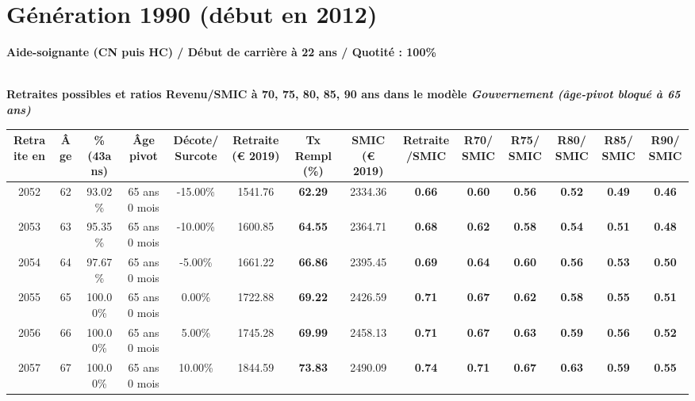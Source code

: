 \newpage 
 
\section{Génération 1990 (début en 2012)\label{AideSoignant_100_22_1990_0}} 
 
{\bf \noindent Aide-soignante (CN puis HC) / Début de carrière à 22 ans / Quotité : 100\%}  ~ 

 ~\\{\bf \noindent Retraites possibles et ratios Revenu/SMIC à 70, 75, 80, 85, 90 ans dans le modèle \emph{Gouvernement (âge-pivot bloqué à 65 ans)}}  
 
\begin{adjustbox}{max width=\textwidth} 
\begin{tabular}[htb]{|c|c||c|c|c||c|c||c|c||c|c|c|c|c|} 
\hline 
 Retraite en &  Âge &  \%(43ans) &  Âge pivot &  Décote/Surcote &  Retraite (\euro{} 2019) &  Tx Rempl(\%) &  SMIC (\euro{} 2019) &  Retraite/SMIC &  R70/SMIC &  R75/SMIC &  R80/SMIC &  R85/SMIC &  R90/SMIC \\ 
\hline \hline 
 2052 &  62 &  93.02\% &  65 ans 0 mois &  -15.00\% &  1541.76 &  {\bf 62.29} &  2334.36 &  {\bf {\color{red} 0.66}} &  {\bf {\color{red} 0.60}} &  {\bf {\color{red} 0.56}} &  {\bf {\color{red} 0.52}} &  {\bf {\color{red} 0.49}} &  {\bf {\color{red} 0.46}} \\ 
\hline 
 2053 &  63 &  95.35\% &  65 ans 0 mois &  -10.00\% &  1600.85 &  {\bf 64.55} &  2364.71 &  {\bf {\color{red} 0.68}} &  {\bf {\color{red} 0.62}} &  {\bf {\color{red} 0.58}} &  {\bf {\color{red} 0.54}} &  {\bf {\color{red} 0.51}} &  {\bf {\color{red} 0.48}} \\ 
\hline 
 2054 &  64 &  97.67\% &  65 ans 0 mois &  -5.00\% &  1661.22 &  {\bf 66.86} &  2395.45 &  {\bf {\color{red} 0.69}} &  {\bf {\color{red} 0.64}} &  {\bf {\color{red} 0.60}} &  {\bf {\color{red} 0.56}} &  {\bf {\color{red} 0.53}} &  {\bf {\color{red} 0.50}} \\ 
\hline 
 2055 &  65 &  100.00\% &  65 ans 0 mois &  0.00\% &  1722.88 &  {\bf 69.22} &  2426.59 &  {\bf {\color{red} 0.71}} &  {\bf {\color{red} 0.67}} &  {\bf {\color{red} 0.62}} &  {\bf {\color{red} 0.58}} &  {\bf {\color{red} 0.55}} &  {\bf {\color{red} 0.51}} \\ 
\hline 
 2056 &  66 &  100.00\% &  65 ans 0 mois &  5.00\% &  1745.28 &  {\bf 69.99} &  2458.13 &  {\bf {\color{red} 0.71}} &  {\bf {\color{red} 0.67}} &  {\bf {\color{red} 0.63}} &  {\bf {\color{red} 0.59}} &  {\bf {\color{red} 0.56}} &  {\bf {\color{red} 0.52}} \\ 
\hline 
 2057 &  67 &  100.00\% &  65 ans 0 mois &  10.00\% &  1844.59 &  {\bf 73.83} &  2490.09 &  {\bf {\color{red} 0.74}} &  {\bf {\color{red} 0.71}} &  {\bf {\color{red} 0.67}} &  {\bf {\color{red} 0.63}} &  {\bf {\color{red} 0.59}} &  {\bf {\color{red} 0.55}} \\ 
\hline 
\hline 
\end{tabular} 
\end{adjustbox} 
 
